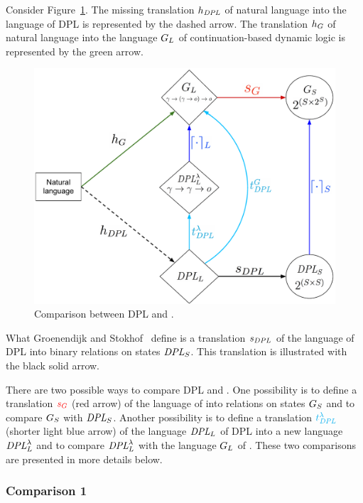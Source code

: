 Consider Figure~\ref{DPLscheme}. The missing translation $h_{\textit{DPL}}$ of natural language into the language of DPL is represented by the dashed arrow. The translation $h_G$ of natural language into the language $G_L$ of continuation-based dynamic logic is represented by the green arrow.
 \begin{figure}[h!]
  \centering
    \includegraphics[width=1\textwidth]{images/DPLscheme.pdf}
      \caption{Comparison between DPL and {\GN}.} \label{DPLscheme}
\end{figure}

What Groenendijk and Stokhof~\cite{GroenendijkStokhof:1991:Dynamic-Predicate-Logic} define is a translation $s_{DPL}$ of the language of DPL into binary relations on states $\textit{DPL}_{S}$. This translation is illustrated with the black solid arrow.

There are two possible ways to compare DPL and {\GN}. One possibility is to define a translation $\textcolor{red}{s_{G}}$ (red arrow) of the language of {\GN} into relations on states $G_S$ and to compare  $G_S$ with $\textit{DPL}_{S}$. Another possibility is to define a translation $\textcolor{cyan}{t^{\lambda}_\textit{DPL}}$ (shorter light blue arrow) of the language $\textit{DPL}_L$ of DPL into a new language $\textit{DPL}^\lambda_L$ and to compare $\textit{DPL}^\lambda_L$ with the language  $G_L$ of {\GN}. These two comparisons are presented in more details below.


\subsubsection{Comparison 1}

